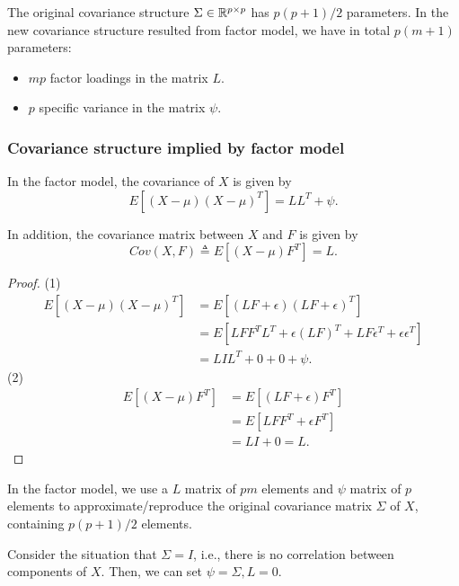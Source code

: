 \begin{refsection}
\begin{remark}
The original covariance structure $\Sigma\in \mathbb{R}^{p\times p}$ has $p(p+1)/2$ parameters. In the new covariance structure resulted from factor model, we have in total $p(m+1)$ parameters:
\begin{itemize}
	\item $mp$ factor loadings in the matrix $L$.
	\item $p$ specific variance in the matrix $\psi$.
\end{itemize} 	
\end{remark}


\subsubsection{Covariance structure implied by factor model}
\begin{lemma}\cite[483]{johnson2007applied}
In the factor model, the covariance of $X$  is given by
$$E[(X-\mu)(X-\mu)^T] = LL^T + \psi.$$	

In addition, the covariance matrix between $X$ and $F$ is given by
$$Cov(X,F) \triangleq E[(X - \mu)F^T] = L.$$
\end{lemma}
\begin{proof}
(1)	
\begin{align*}
E[(X-\mu)(X-\mu)^T] &= E[(LF + \epsilon)(LF + \epsilon)^T] \\
&=E[LFF^TL^T + \epsilon (LF)^T + LF\epsilon^T + \epsilon \epsilon^T] \\
&= LIL^T + 0 + 0 + \psi. 
\end{align*}	
(2)
\begin{align*}
E[(X-\mu)F^T] &= E[(LF + \epsilon)F^T] \\
&=E[LFF^T + \epsilon F^T] \\
&= LI + 0 = L. 
\end{align*}
\end{proof}


\begin{remark}
In the factor model, we use a $L$ matrix of $pm$ elements and $\psi$ matrix of $p$ elements to approximate/reproduce the original covariance matrix $\Sigma$ of $X$, containing $p(p+1)/2$ elements. 	
\end{remark}

\begin{remark}[$L = 0$ if there is no correlation between components of $X$]
Consider the situation that $\Sigma = I$, i.e., there is no correlation between components of $X$. Then, we can set $\psi = \Sigma, L = 0$.	
\end{remark}


\end{refsection}
